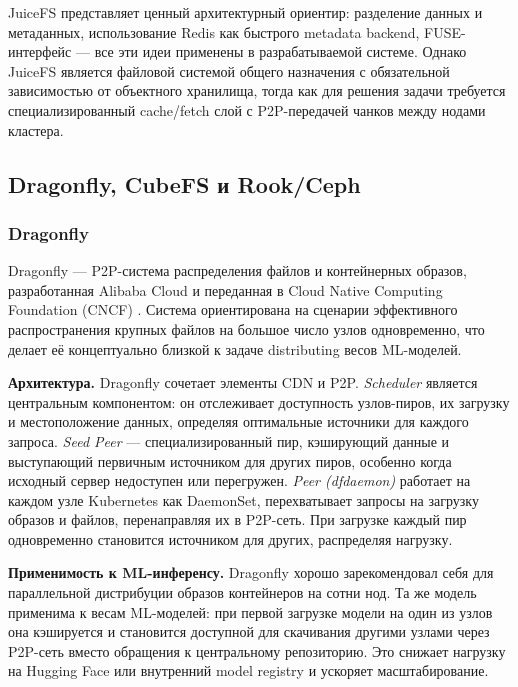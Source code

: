 JuiceFS представляет ценный архитектурный ориентир: разделение данных и метаданных, использование Redis как быстрого metadata backend, FUSE-интерфейс --- все эти идеи применены в разрабатываемой системе. Однако JuiceFS является файловой системой общего назначения с обязательной зависимостью от объектного хранилища, тогда как для решения задачи требуется специализированный cache/fetch слой с P2P-передачей чанков между нодами кластера.

\subsection{Dragonfly, CubeFS и Rook/Ceph}
\label{sec:alternatives}

\subsubsection*{Dragonfly}

Dragonfly --- P2P-система распределения файлов и контейнерных образов, разработанная Alibaba Cloud и переданная в Cloud Native Computing Foundation (CNCF) \cite{dragonfly_blog}. Система ориентирована на сценарии эффективного распространения крупных файлов на большое число узлов одновременно, что делает её концептуально близкой к задаче distributing весов ML-моделей.

\textbf{Архитектура.} Dragonfly сочетает элементы CDN и P2P. \textit{Scheduler} является центральным компонентом: он отслеживает доступность узлов-пиров, их загрузку и местоположение данных, определяя оптимальные источники для каждого запроса. \textit{Seed Peer} --- специализированный пир, кэширующий данные и выступающий первичным источником для других пиров, особенно когда исходный сервер недоступен или перегружен. \textit{Peer (dfdaemon)} работает на каждом узле Kubernetes как DaemonSet, перехватывает запросы на загрузку образов и файлов, перенаправляя их в P2P-сеть. При загрузке каждый пир одновременно становится источником для других, распределяя нагрузку.

\textbf{Применимость к ML-инференсу.} Dragonfly хорошо зарекомендовал себя для параллельной дистрибуции образов контейнеров на сотни нод. Та же модель применима к весам ML-моделей: при первой загрузке модели на один из узлов она кэшируется и становится доступной для скачивания другими узлами через P2P-сеть вместо обращения к центральному репозиторию. Это снижает нагрузку на Hugging Face или внутренний model registry и ускоряет масштабирование.

